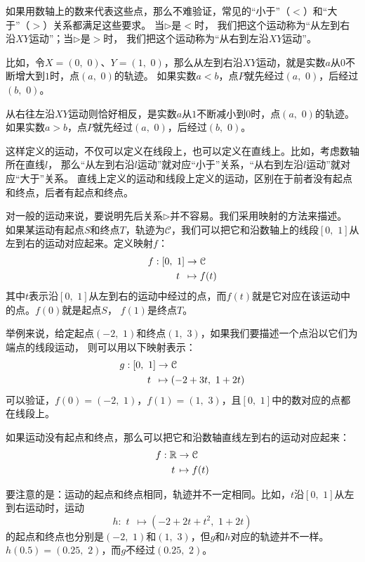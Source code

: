 \documentclass[12pt,UTF8]{ctexbook}
\begin{document}
如果用数轴上的数来代表这些点，那么不难验证，常见的“小于”（$<$）和“大于”（$>$）关系都满足这些要求。
当$\triangleright$是$<$时，
我们把这个运动称为“从左到右沿$XY$运动”；当$\triangleright$是$>$时，
我们把这个运动称为“从右到左沿$XY$运动”。

比如，令$X = (0,\,\,0)$、$Y = (1,\,\,0)$，那么从左到右沿$XY$运动，就是实数$a$从$0$不断增大到$1$时，点$(a,\,\,0)$的轨迹。
如果实数$a<b$，点$P$就先经过$(a,\,\,0)$，后经过$(b,\,\,0)$。

从右往左沿$XY$运动则恰好相反，是实数$a$从$1$不断减小到$0$时，点$(a,\,\,0)$的轨迹。
如果实数$a>b$，点$P$就先经过$(a,\,\,0)$，后经过$(b,\,\,0)$。

这样定义的运动，不仅可以定义在线段上，也可以定义在直线上。比如，考虑数轴所在直线$l$，
那么“从左到右沿$l$运动”就对应“小于”关系，“从右到左沿$l$运动”就对应“大于”关系。
直线上定义的运动和线段上定义的运动，区别在于前者没有起点和终点，后者有起点和终点。

对一般的运动来说，要说明先后关系$\triangleright$并不容易。我们采用映射的方法来描述。
如果某运动有起点$S$和终点$T$，轨迹为$\mathcal{C}$，我们可以把它和沿数轴上的线段$[0,\,\,1]$从左到右的运动对应起来。定义映射$f$：
\begin{align}
    f: [0,\,\,1] &\rightarrow \mathcal{C} \notag \\
         t \,\,\, &\mapsto f(t) \notag
\end{align}
其中$t$表示沿$[0,\,\,1]$从左到右的运动中经过的点，而$f(t)$就是它对应在该运动中的点。$f(0)$就是起点$S$，
$f(1)$是终点$T$。

举例来说，给定起点$(-2,\,\,1)$和终点$(1,\,\,3)$，如果我们要描述一个点沿以它们为端点的线段运动，
则可以用以下映射表示：
\begin{align}
    g: [0,\,\,1] &\rightarrow \mathcal{C} \notag \\
         t \,\,\, &\mapsto (-2 + 3t,\,\, 1 + 2t) \notag
\end{align}
可以验证，$f(0) = (-2,\,\,1)$，$f(1) = (1,\,\,3)$，且$[0,\,\,1]$中的数对应的点都在线段上。

如果运动没有起点和终点，那么可以把它和沿数轴直线左到右的运动对应起来：
\begin{align}
    f: \mathbb{R} &\rightarrow \mathcal{C} \notag \\
         t \, &\mapsto f(t) \notag
\end{align}

要注意的是：运动的起点和终点相同，轨迹并不一定相同。比如，$t$沿$[0,\,\,1]$从左到右运动时，运动
$$ h: \,\, t \,\,\, \mapsto (-2 + 2t + t^2,\,\, 1 + 2t) $$
的起点和终点也分别是$(-2,\,\,1)$和$(1,\,\,3)$，但$g$和$h$对应的轨迹并不一样。
$h(0.5) = (0.25, \,\,2)$，而$g$不经过$(0.25, \,\,2)$。
\end{document}
